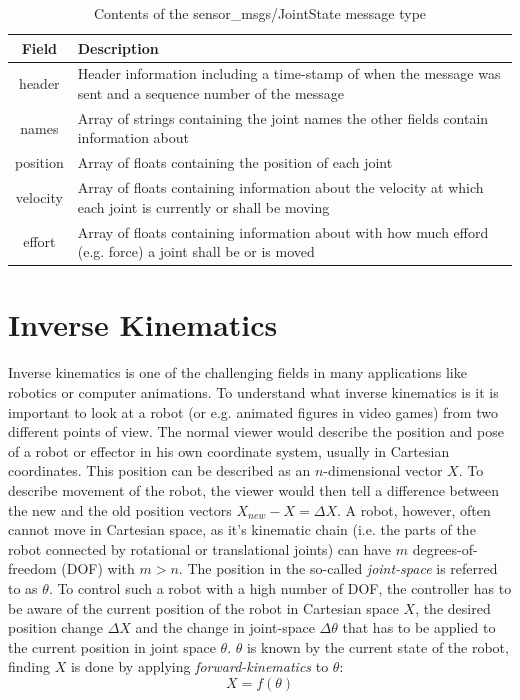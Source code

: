 \begin{table}
	\caption{\label{tab:rosmsg:contents}Contents of the  \mbox{sensor\_msgs/JointState} message type}
	
	\begin{tabularx}{\linewidth}{|c|X|}
		\hline
		\textbf{Field} & \textbf{Description} \\
		\hline
		header & Header information including a time-stamp of when the message was sent and a sequence number of the message \\
		\hline
		names & Array of strings containing the joint names the other fields contain information about \\
		\hline
		position & Array of floats containing the position of each joint \\
		\hline
		velocity & Array of floats containing information about the velocity at which each joint is currently or shall be moving \\
		\hline
		effort & Array of floats containing information about with how much efford (e.g. force) a joint shall be or is moved \\
		\hline
	\end{tabularx}
\end{table}

\section{Inverse Kinematics}

Inverse kinematics is one of the challenging fields in many applications like robotics or computer animations\cite{Starke2017}. To understand what inverse kinematics is it is important to look at a robot (or e.g. animated figures in video games) from two different points of view. The normal viewer would describe the position and pose of a robot or effector in his own coordinate system, usually in Cartesian coordinates. This position can be described as an $n$-dimensional vector $X$. To describe movement of the robot, the viewer would then tell a difference between the new and the old position vectors $X_{new}-X=\Delta X$. A robot, however, often cannot move in Cartesian space, as it's kinematic chain (i.e. the parts of the robot connected by rotational or translational joints) can have $m$ degrees-of-freedom (DOF) with $m > n$. The position in the so-called \textit{joint-space} is referred to as $\theta$. To control such a robot with a high number of DOF, the controller has to be aware of the current position of the robot in Cartesian space $X$, the desired position change $\Delta X$ and the change in joint-space $\Delta \theta$ that has to be applied to the current position in joint space $\theta$. $\theta$ is known by the current state of the robot, finding $X$ is done by applying \textit{forward-kinematics} to $\theta$:
\begin{equation*}
	X = f(\theta)
\end{equation*}

